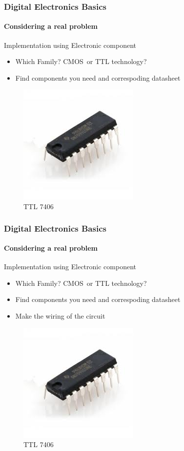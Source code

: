 \documentclass{beamer}
\begin{document}
\begin{frame}
  \frametitle{Digital Electronics Basics}
  \framesubtitle{Considering a real problem}
  \begin{block}{Implementation using Electronic component}
    \begin{itemize}
	\item Which Family? CMOS or TTL technology?
	\item Find components you need and correspoding datasheet
    \end{itemize}
  \end{block}

    \begin{figure}
      \centering
      \includegraphics[width=.2\textwidth]{./images/ttl_7406.png}
      \caption{TTL 7406}
    \end{figure}
\end{frame}

\begin{frame}
  \frametitle{Digital Electronics Basics}
  \framesubtitle{Considering a real problem}
  \begin{block}{Implementation using Electronic component}
    \begin{itemize}
	\item Which Family? CMOS or TTL technology?
	\item Find components you need and correspoding datasheet
	\item Make the wiring of the circuit
    \end{itemize}
  \end{block}

    \begin{figure}
      \centering
      \includegraphics[width=.2\textwidth]{./images/ttl_7406.png}
      \caption{TTL 7406}
    \end{figure}
\end{frame}
\end{document}
